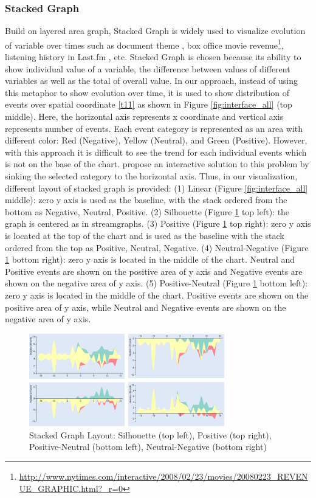 \documentclass{vgtc}                          %
\begin{document}
\subsubsection{Stacked Graph}
Build on layered area graph, Stacked Graph is widely used to visualize evolution of variable over times such as document theme \cite{havre}, box office movie revenue\footnote{\url{http://www.nytimes.com/interactive/2008/02/23/movies/20080223_REVENUE_GRAPHIC.html?_r=0}}, listening history in Last.fm \cite{byron}, etc. Stacked Graph is chosen because its ability to show individual value of a variable, the difference between values of different variables as well as the total of overall value. In our approach, instead of using this metaphor to show evolution over time, it is used to show distribution of events over spatial coordinate \ref{t11} as shown in Figure \ref{fig:interface_all} (top middle). Here, the horizontal axis represents x coordinate and vertical axis represents number of events. Each event category is represented as an area with different color: Red (Negative), Yellow (Neutral), and Green (Positive). However, with this approach it is difficult to see the trend for each individual events which is not on the base of the chart. \cite{alan} propose an interactive solution to this problem by sinking the selected category to the horizontal axis. Thus, in our visualization, different layout of stacked graph is provided: (1) Linear (Figure \ref{fig:interface_all} middle): zero y axis is used as the baseline, with the stack ordered from the bottom as Negative, Neutral, Positive. (2) Silhouette (Figure \ref{fig:layout} top left): the graph is centered as in streamgraphs. (3) Positive (Figure \ref{fig:layout} top right): zero y axis is located at the top of the chart and is used as the baseline with the stack ordered from the top as Positive, Neutral, Negative. (4) Neutral-Negative (Figure \ref{fig:layout} bottom right): zero y axis is located in the middle of the chart. Neutral and Positive events are shown on the positive area of y axis and Negative events are shown on the negative area of y axis. (5) Positive-Neutral (Figure \ref{fig:layout} bottom left): zero y axis is located in the middle of the chart. Positive events are shown on the positive area of y axis, while Neutral and Negative events are shown on the negative area of y axis.
\begin{figure}
	\centering
	\includegraphics[width=85mm]{images/layout.png}
	\caption{Stacked Graph Layout: Silhouette (top left), Positive (top right), Positive-Neutral (bottom left), Neutral-Negative (bottom right)}
	\label{fig:layout}
\end{figure}
\end{document}
